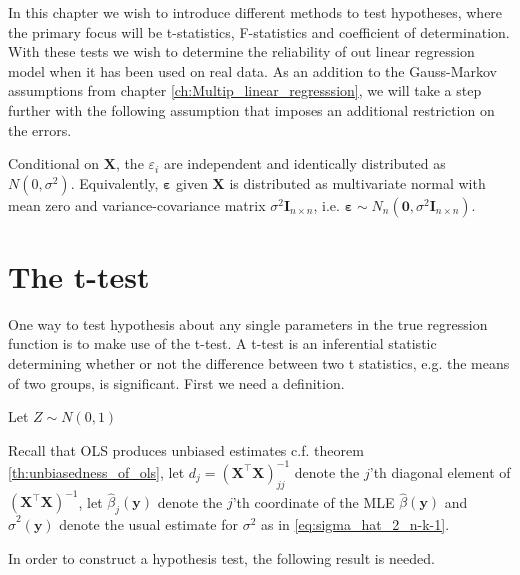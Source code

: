 In this chapter we wish to introduce different methods to test hypotheses, where the primary focus will be t-statistics, F-statistics and coefficient of determination. 
With these tests we wish to determine the reliability of out linear regression model when it has been used on real data.
As an addition to the Gauss-Markov assumptions from chapter \ref{ch:Multip_linear_regresssion}, we will take a step further with the following assumption that imposes an additional restriction on the errors. 

\begin{assumption} \label{as:normality_of_errors}
    Conditional on $\mathbf{X}$, the $\varepsilon_i$ are independent and identically distributed as $N(0, \sigma^2)$. Equivalently, $\boldsymbol{\varepsilon}$ given $\mathbf{X}$ is distributed as multivariate normal with mean zero and variance-covariance matrix $\sigma^2 \mathbf{I}_{n \times n}$, i.e. $\boldsymbol{\varepsilon} \sim N_n(\mathbf{0}, \sigma^2 \mathbf{I}_{n \times n})$.
\end{assumption}

\section{The t-test}
One way to test hypothesis about any single parameters in the true regression function is to make use of the t-test. 
A t-test is an inferential statistic determining whether or not the difference between two t statistics, e.g. the means of two groups, is significant. First we need a definition.

\begin{definition}
    Let $Z \sim N(0,1)$ 
\end{definition}

Recall that OLS produces unbiased estimates c.f. theorem \ref{th:unbiasedness_of_ols}, let $d_j=(\textbf{X}^\top\textbf{X})^{-1}_{jj}$ denote the $j$'th diagonal element of $(\textbf{X}^\top \textbf{X})^{-1}$, let $\hat{\beta}_j(\textbf{y})$ denote the $j$'th coordinate of the MLE $\hat{\beta}(\textbf{y})$ and $\hat{\sigma}^2(\textbf{y})$ denote the usual estimate for $\sigma^2$ as in \eqref{eq:sigma_hat_2_n-k-1}.

In order to construct a hypothesis test, the following result is needed.


